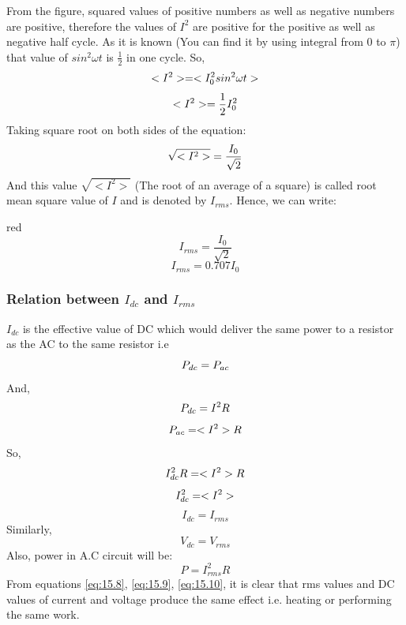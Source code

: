 From the figure, squared values of positive numbers as well as
negative numbers are positive, therefore the values
of $I^{2}$ are positive for the positive as well as negative half cycle.
As it is known (You can find it by using integral from 0 to $\pi$) that
value of $sin^{2}\omega t$ is $\frac{1}{2}$ in one cycle. So,
\begin{equation}\notag
    <I^{2}> = < I_{0}^{2} sin^{2} \omega t >
\end{equation}
\begin{equation}\notag
    <I^{2}> = \frac{1}{2}  I_{0}^{2} 
\end{equation}
Taking square root on both sides of the equation:
\begin{equation}\notag
   \sqrt{ <I^{2}>} = \frac{I_{0}}{\sqrt{2}}  
\end{equation}
And this value $\sqrt{ <I^{2}>}$ (The root of an average of a square) is
called root mean square value of $I$ and is denoted by 
$I_{rms}$.
Hence, we can write:
\begin{mybox}{red}{}
    \begin{equation}\label{15.6}
        I_{rms} = \frac{I_{0}}{\sqrt{2}}  
     \end{equation}
     \begin{equation}
        I_{rms} = 0.707 I_{0}  
     \end{equation}  
\end{mybox}
\subsubsection{Relation between $I_{dc}$ and $I_{rms}$}
$I_{dc}$ is the effective value of DC which would deliver the same power to a resistor as the AC to the same resistor i.e
\begin{equation}\notag
    P_{dc} = P_{ac}
\end{equation}
And,
\begin{equation}\notag
    P_{dc} = I^{2}R
\end{equation}
\begin{equation}\notag
    P_{ac} = <I^{2}>R
\end{equation}
So,
\begin{equation}\notag
     I^{2}_{dc}R  = <I^{2}>R
\end{equation}
\begin{equation}\notag
     I^{2}_{dc}  = <I^{2}>
\end{equation}
\begin{equation}\label{eq:15.8}
     I_{dc} = I_{rms}
\end{equation}
Similarly,
\begin{equation}\label{eq:15.9}
     V_{dc} = V_{rms}
\end{equation}
Also, power in A.C circuit will be:
\begin{equation}\label{eq:15.10}
     P = I_{rms}^{2}R
\end{equation}
From equations \ref{eq:15.8}, \ref{eq:15.9}, \ref{eq:15.10},
it is clear that rms values and DC values of current and
voltage produce the same effect i.e. heating or performing the same work.

